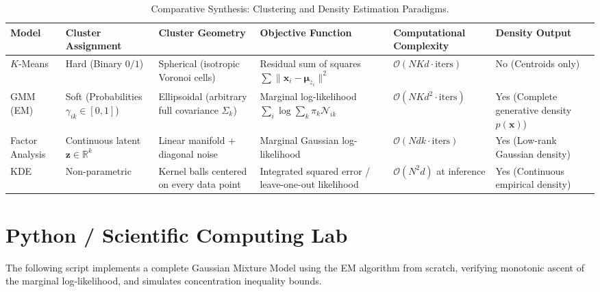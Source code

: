 \begin{table}[htbp]
\centering
\footnotesize
\setlength{\tabcolsep}{3pt}
\begin{tabularx}{\textwidth}{lXXXXX}
\toprule
\textbf{Model} & \textbf{Cluster Assignment} & \textbf{Cluster Geometry} & \textbf{Objective Function} & \textbf{Computational Complexity} & \textbf{Density Output} \\
\midrule
$K$-Means & Hard (Binary $0/1$) & Spherical (isotropic Voronoi cells) & Residual sum of squares $\sum \|\mathbf{x}_i - \boldsymbol{\mu}_{z_i}\|^2$ & $\mathcal{O}(N K d \cdot \text{iters})$ & No (Centroids only) \\
\addlinespace
GMM (EM) & Soft (Probabilities $\gamma_{ik} \in [0, 1]$) & Ellipsoidal (arbitrary full covariance $\Sigma_k$) & Marginal log-likelihood $\sum_i \log \sum_k \pi_k \mathcal{N}_{ik}$ & $\mathcal{O}(N K d^2 \cdot \text{iters})$ & Yes (Complete generative density $p(\mathbf{x})$) \\
\addlinespace
Factor Analysis & Continuous latent $\mathbf{z} \in \mathbb{R}^k$ & Linear manifold + diagonal noise & Marginal Gaussian log-likelihood & $\mathcal{O}(N d k \cdot \text{iters})$ & Yes (Low-rank Gaussian density) \\
\addlinespace
KDE & Non-parametric & Kernel balls centered on every data point & Integrated squared error / leave-one-out likelihood & $\mathcal{O}(N^2 d)$ at inference & Yes (Continuous empirical density) \\
\bottomrule
\end{tabularx}
\caption{Comparative Synthesis: Clustering and Density Estimation Paradigms.}
\label{tab:clustering_comp}
\end{table}

\section{Python / Scientific Computing Lab}

The following script implements a complete Gaussian Mixture Model using the EM algorithm from scratch, verifying monotonic ascent of the marginal log-likelihood, and simulates concentration inequality bounds.

